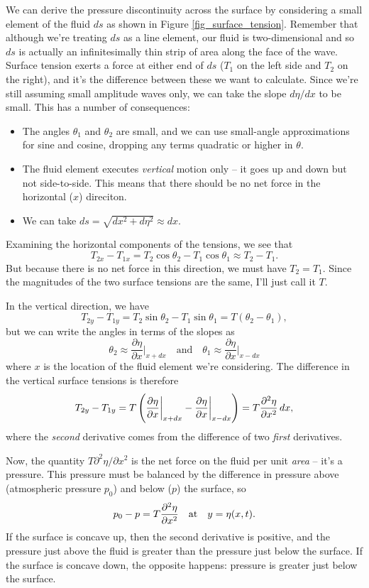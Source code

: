 We can derive the pressure discontinuity across the surface by considering a small element of the fluid $ds$ as shown in Figure \ref{fig_surface_tension}.  Remember that although we're treating $ds$ as a line element, our fluid is two-dimensional and so $ds$ is actually an infinitesimally thin strip of area along the face of the wave.  Surface tension exerts a force at either end of $ds$ ($T_1$ on the left side and  $T_2$ on the right), and it's the difference between these we want to calculate.  Since we're still assuming small amplitude waves only, we can take the slope $d\eta/dx$ to be small.  This has a number of consequences:
\begin{itemize}
\item The angles $\theta_1$ and $\theta_2$ are small, and we can use small-angle approximations for sine and cosine, dropping any terms quadratic or higher in $\theta$.
\item The fluid element executes \emph{vertical} motion only -- it goes up and down but not side-to-side.  This means that there should be no net force in the horizontal ($x$) direciton.
\item We can take $ds = \sqrt{dx^2 + d\eta^2} \approx dx$.
\end{itemize}

Examining the horizontal components of the tensions, we see that
\[
T_{2x} - T_{1x} = T_2 \cos\theta_2 - T_1 \cos \theta_1 \approx T_2 - T_1.
\]
But because there is no net force in this direction, we must have $T_2 = T_1$. Since the magnitudes of the two surface tensions are the same, I'll just call it $T$.

In the vertical direction, we have
\[
T_{2y} - T_{1y} = T_2 \sin\theta_2 - T_1 \sin \theta_1 = T ( \theta_2 - \theta_1),
\]
but we can write the angles in terms of the slopes as
\[
\theta_2 \approx \frac{\partial\eta}{\partial x}\bigg|_{x + dx} \quad \text{and} \quad \theta_1 \approx \frac{\partial\eta}{\partial x}\bigg|_{x - dx}
\]
where $x$ is the location of the fluid element we're considering.  The difference in the vertical surface tensions is therefore
\begin{equation}
T_{2y} - T_{1y} = T \left( \frac{\partial\eta}{\partial x}\bigg|_{x+dx} - \frac{\partial\eta}{\partial x} \bigg|_{x-dx} \right) = T \frac{\partial^2 {\eta}}{\partial {x}^2} \, dx,
\end{equation}
where the \emph{second} derivative comes from the difference of two \emph{first} derivatives.

Now, the quantity $T \partial^2\eta / \partial x^2$ is the net force on the fluid per unit \emph{area} -- it's a pressure.  This pressure must be balanced by the difference in pressure above (atmospheric pressure $p_0$) and below ($p$) the surface, so 
\begin{equation}
p_0 - p = T \frac{\partial^2 {\eta}}{\partial {x}^2} \quad \text{at} \quad y = \eta(x, t).
\end{equation}
If the surface is concave up, then the second derivative is positive, and the pressure just above the fluid is greater than the pressure just below the surface.  If the surface is concave down, the opposite happens:  pressure is greater just below the surface.

